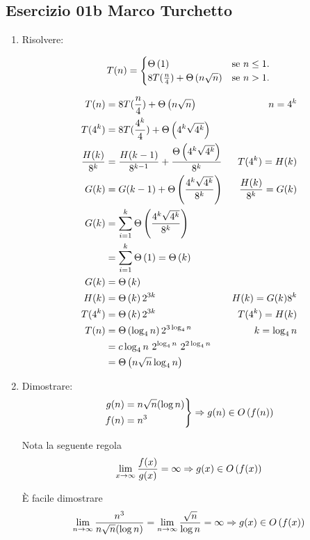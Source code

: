 
\subsection[01b MT]{Esercizio 01b Marco Turchetto}
\begin{enumerate}[label=\alph*)]
\item Risolvere:

\begin{equation}
	T(n)=\begin{cases}
		\Theta\left(1\right)							            & \text{se $n \leq 1$}.\\
		\text{$8T( \frac{n}{4} ) + \Theta\left(n \sqrt{n}\right) $} & \text{se $n > 1$}.
 	\end{cases}
\end{equation}

\begin{align*}
	T(n) &= 8T(\frac{n}{4}) + \Theta\left( n \sqrt{n}\right)  & n = 4^k \\
	T(4^k) &= 8T(\frac{4^k}{4}) + \Theta\left(4^k \sqrt{4^k}\right) \\
	\frac{H(k)}{8^k} &= \frac{H(k-1)}{8^{k-1}} + \frac{\Theta\left(4^k \sqrt{4^k}\right)}{8^k} & T(4^k) = H(k) \\
	G(k) &= G(k-1) + \Theta\left(\frac{4^k \sqrt{4^k}}{8^k}\right) & \frac{H(k)}{8^k} = G(k)\\
	G(k) &= \sum _{i=1} ^{k} \Theta\left(\frac{4^k \sqrt{4^k}}{8^k}\right) \\
	     &= \sum _{i=1} ^{k} \Theta\left(1\right) = \Theta\left(k\right) \\
	G(k) &= \Theta\left(k\right) \\
	H(k) &= \Theta\left(k\right) 2^{3k} & H(k) = G(k) 8^k\\
	T(4^k) &= \Theta\left(k\right) 2^{3k} & T(4^k) = H(k) \\
	T(n) &= \Theta\left(\log _4 n\right) 2^{3 \log_4 n} & k= \log_4 n \\ 
	     &= c \log _4 n \ 2^{\log_4 n} \ 2 ^ {2 \log _ 4 n} \\
	     &= \Theta\left(n \sqrt{n} \log_4 n\right)
\end{align*}

\item Dimostrare:
\begin{equation*}
\left.
	\begin{aligned}
		g(n) &= n \sqrt{n}(\log n) \\
		f(n) &= n^3
	\end{aligned}
\right \} \Rightarrow  g(n) \in O\left(f(n)\right) 
\end{equation*}

Nota la seguente regola
\begin{equation*}
	\lim _{x \to \infty} \frac{f(x)}{g(x)} = \infty \Rightarrow g(x) \in O\left(f(x)\right)
\end{equation*}

\`{E} facile dimostrare
\begin{align*}
	\lim _{n \to \infty} \frac{n^3}{n \sqrt{n}(\log n)} = \lim _{n \to \infty} \frac{\sqrt{n}}{ \log n} = \infty \Rightarrow g(x) \in O\left(f(x)\right)
\end{align*}
\end{enumerate}
